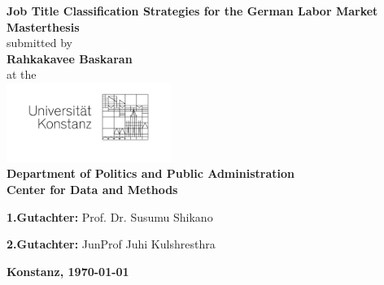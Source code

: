 \documentclass[12pt, a4paper, titlepage]{article}
\begin{document}
\begin{titlepage}
    \begin{center}
    {\LARGE \textbf{Job Title Classification Strategies for the German Labor Market}}
    \\[1cm]
    {\Large \textbf{Masterthesis}}
    \\[1cm]
    {\Large submitted by}
    \\[0.5cm]
    {\LARGE \textbf{Rahkakavee Baskaran}}
    \\[0.5cm]
    {\Large at the}
    \\[0.5cm]
    \includegraphics[width=0.4\textwidth]{logo.jpg}
    \\[1cm]
    {\Large \textbf{Department of Politics and Public Administration}}
    \\[1cm]
    {\Large \textbf{Center for Data and Methods}}
    \\[2cm]
    \begin{minipage}[c]{0.8\textwidth}
    \begin{description}
     \item {\Large \textbf{1.Gutachter:} Prof. Dr. Susumu Shikano}
     \item {\Large \textbf{2.Gutachter:} JunProf Juhi Kulshresthra}
    \end{description}
    \end{minipage}
    \vfill
    {\LARGE \textbf{Konstanz, \today}}
    \end{center}
    \end{titlepage}

\tableofcontents
\newpage


\end{document}
